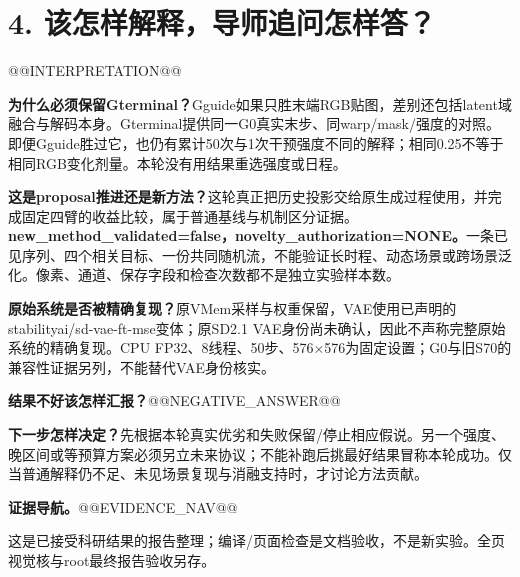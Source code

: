 \documentclass[UTF8,10pt,a4paper]{ctexart}
\begin{document}
\clearpage
\section*{4. 该怎样解释，导师追问怎样答？}
@@INTERPRETATION@@

\textbf{为什么必须保留Gterminal？}Gguide如果只胜末端RGB贴图，差别还包括latent域融合与解码本身。Gterminal提供同一G0真实末步、同warp/mask/强度的对照。即便Gguide胜过它，也仍有累计50次与1次干预强度不同的解释；相同0.25不等于相同RGB变化剂量。本轮没有用结果重选强度或日程。

\textbf{这是proposal推进还是新方法？}这轮真正把历史投影交给原生成过程使用，并完成固定四臂的收益比较，属于普通基线与机制区分证据。\textbf{new\_method\_validated=false，novelty\_authorization=NONE。}一条已见序列、四个相关目标、一份共同随机流，不能验证长时程、动态场景或跨场景泛化。像素、通道、保存字段和检查次数都不是独立实验样本数。

\textbf{原始系统是否被精确复现？}原VMem采样与权重保留，VAE使用已声明的stabilityai/sd-vae-ft-mse变体；原SD2.1 VAE身份尚未确认，因此不声称完整原始系统的精确复现。CPU FP32、8线程、50步、576×576为固定设置；G0与旧S70的兼容性证据另列，不能替代VAE身份核实。

\textbf{结果不好该怎样汇报？}@@NEGATIVE_ANSWER@@

\textbf{下一步怎样决定？}先根据本轮真实优劣和失败保留/停止相应假说。另一个强度、晚区间或等预算方案必须另立未来协议；不能补跑后挑最好结果冒称本轮成功。仅当普通解释仍不足、未见场景复现与消融支持时，才讨论方法贡献。

\textbf{证据导航。}@@EVIDENCE_NAV@@

\vfill\noindent\small\textcolor{accent}{这是已接受科研结果的报告整理；编译/页面检查是文档验收，不是新实验。全页视觉核与root最终报告验收另存。}
\end{document}
